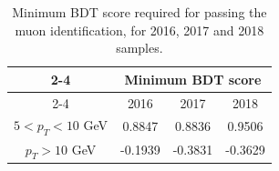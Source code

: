 \begin{table}[h!]
    \centering
    \begin{tabular}{|c|c c c|}
\cline{2-4}
  \multicolumn{1}{ c|}{}             & \multicolumn{3}{|c|}{Minimum BDT score}                        \\
\cline{2-4} %
 \multicolumn{1}{c|}{} & 2016    &  2017 & 2018  \\
\hline %
$ 5 < p_T < 10 $ GeV &  0.8847  & 0.8836   & 0.9506       \\ %
$p_T > 10$ GeV         &  -0.1939 & -0.3831  & -0.3629      \\ %
\hline %
     \end{tabular}
\small
    \caption{Minimum BDT score required for passing the muon identification, for 2016, 2017 and 2018 samples.}%
    \label{tab:muon_ID_WPA}
\end{table}

\clearpage
